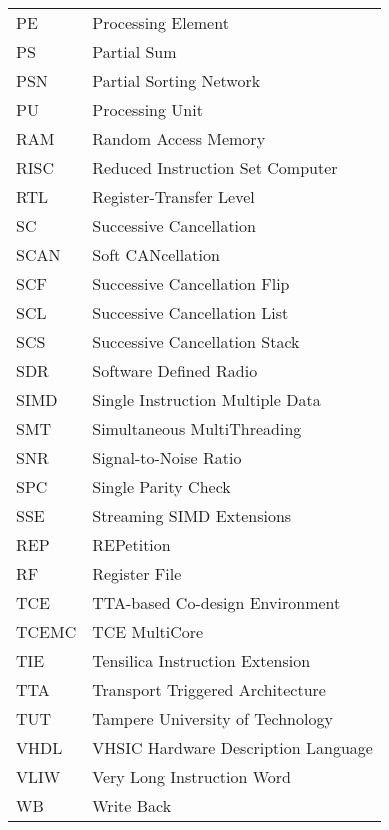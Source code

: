 \begin{center}
\begin{longtable}{ p{}  p{} }
PE        & Processing Element                                     \\
PS        & Partial Sum                                            \\
PSN       & Partial Sorting Network                                \\
PU        & Processing Unit                                        \\
RAM       & Random Access Memory                                   \\
RISC      & Reduced Instruction Set Computer                       \\
RTL       & Register-Transfer Level                                \\
SC        & Successive Cancellation                                \\
SCAN      & Soft CANcellation                                      \\
SCF       & Successive Cancellation Flip                           \\
SCL       & Successive Cancellation List                           \\
SCS       & Successive Cancellation Stack                          \\
SDR       & Software Defined Radio                                 \\
SIMD      & Single Instruction Multiple Data                       \\
SMT       & Simultaneous MultiThreading                            \\
SNR       & Signal-to-Noise Ratio                                  \\
SPC       & Single Parity Check                                    \\
SSE       & Streaming SIMD Extensions                              \\
REP       & REPetition                                             \\
RF        & Register File                                          \\
TCE       & TTA-based Co-design Environment                        \\
TCEMC     & TCE MultiCore                                          \\
TIE       & Tensilica Instruction Extension                        \\
TTA       & Transport Triggered Architecture                       \\
TUT       & Tampere University of Technology                       \\
VHDL      & VHSIC Hardware Description Language                    \\
VLIW      & Very Long Instruction Word                             \\
WB        & Write Back                                             \\
\end{longtable}

\end{center}

